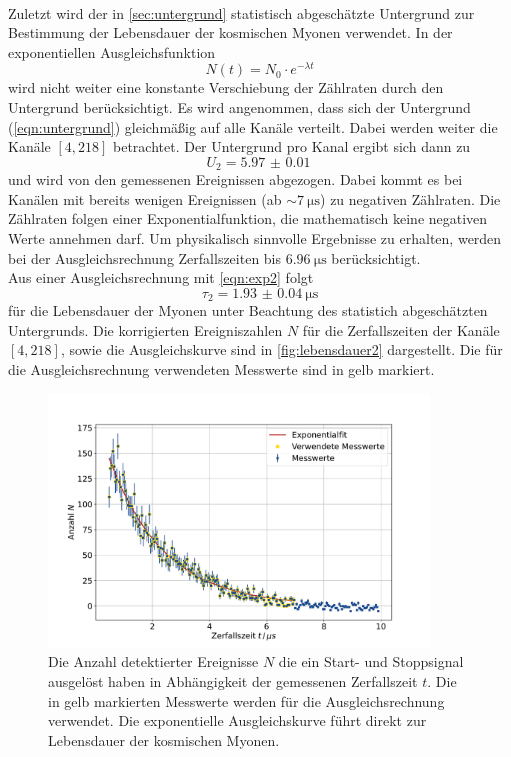 \\
Zuletzt wird der in \autoref{sec:untergrund} statistisch abgeschätzte Untergrund zur Bestimmung der Lebensdauer der kosmischen Myonen verwendet.
In der exponentiellen Ausgleichsfunktion
\begin{equation}
    N(t) = N_0 \cdot e^{- \lambda t}
    \label{eqn:exp2}
\end{equation}
wird nicht weiter eine konstante Verschiebung der Zählraten durch den Untergrund berücksichtigt.
Es wird angenommen, dass sich der Untergrund (\autoref{eqn:untergrund}) gleichmäßig auf alle Kanäle verteilt.
Dabei werden weiter die Kanäle $[4,218]$ betrachtet.
Der Untergrund pro Kanal ergibt sich dann zu
\begin{equation}
    U_2 = \qty{5.97(1)}{}
\end{equation}
und wird von den gemessenen Ereignissen abgezogen.
Dabei kommt es bei Kanälen mit bereits wenigen Ereignissen (ab $\sim \qty{7}{\micro\second}$) zu negativen Zählraten.
Die Zählraten folgen einer Exponentialfunktion, die mathematisch keine negativen Werte annehmen darf.
Um physikalisch sinnvolle Ergebnisse zu erhalten, werden bei der Ausgleichsrechnung Zerfallszeiten bis $\qty{6.96}{\micro\second}$ berücksichtigt.
\\
Aus einer Ausgleichsrechnung mit \autoref{eqn:exp2} folgt
\begin{equation}
    \tau_2 = \qty{1.93(4)}{\micro\second}
\end{equation}
für die Lebensdauer der Myonen unter Beachtung des statistich abgeschätzten Untergrunds.
Die korrigierten Ereigniszahlen $N$ für die Zerfallszeiten der Kanäle $[4,218]$, sowie die Ausgleichskurve sind in \autoref{fig:lebensdauer2} dargestellt.
Die für die Ausgleichsrechnung verwendeten Messwerte sind in gelb markiert.
\begin{figure}
    \centering
    \includegraphics[width=0.9\textwidth]{content/plots/lifetime2.pdf}
    \caption{Die Anzahl detektierter Ereignisse $N$ die ein Start- und Stoppsignal ausgelöst haben in Abhängigkeit der gemessenen Zerfallszeit $t$.
    Die in gelb markierten Messwerte werden für die Ausgleichsrechnung verwendet.
    Die exponentielle Ausgleichskurve führt direkt zur Lebensdauer der kosmischen Myonen.
    }
    \label{fig:lebensdauer2}
\end{figure}